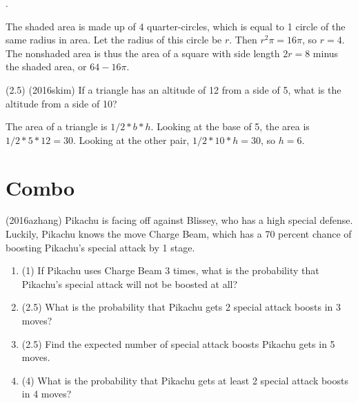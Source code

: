 \documentclass{article}
\begin{document}
\begin{answer}
.
\end{answer}

\begin{solution}
The shaded area is made up of 4 quarter-circles, which is equal to 1 circle of the same radius in area. Let the radius of this circle be $r$. Then $r^{2}\pi = 16\pi$, so $r = 4$. The nonshaded area is thus the area of a square with side length $2r = 8$ minus the shaded area, or $64 - 16\pi$.
\end{solution}


\begin{problem}
(2.5) (2016skim) If a triangle has an altitude of 12 from a side of 5, what is the altitude from a side of 10?
\end{problem}

\begin{answer}
\end{answer}

\begin{solution}
The area of a triangle is $1/2*b*h$. Looking at the base of 5, the area is $1/2*5*12 = 30$. Looking at the other pair, $1/2*10*h = 30$, so $h = 6$.
\end{solution}

\section{Combo}
\begin{problem}
(2016azhang) Pikachu is facing off against Blissey, who has a high special defense. Luckily, Pikachu knows the move Charge Beam, which has a 70 percent chance of boosting Pikachu's special attack by 1 stage. 

\begin{enumerate}
\item (1) If Pikachu uses Charge Beam 3 times, what is the probability that Pikachu's special attack will not be boosted at all?
\item (2.5) What is the probability that Pikachu gets 2 special attack boosts in 3 moves? 
\item (2.5) Find the expected number of special attack boosts Pikachu gets in 5 moves.
\item (4) What is the probability that Pikachu gets at least 2 special attack boosts in 4 moves?
\end{enumerate}
\end{problem}
\end{document}
